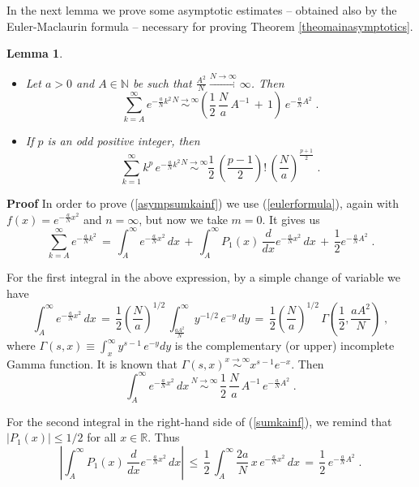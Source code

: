\documentclass[12pt]{article}
\newtheorem{lemma}{Lemma}
\begin{document}
In the next lemma we prove some asymptotic estimates -- obtained also by the Euler-Maclaurin formula -- necessary for proving Theorem \ref{theomainasymptotics}.
\begin{lemma}  \label{lemmaasympeuler}
\begin{itemize}
\item[(i)] Let $a>0$ and $A \in \mathbb{N}$ be such that $\frac{A^2}{N} \stackrel{N \rightarrow \infty}{\rightarrow} \infty$. Then
	\begin{equation}  \label{asympsumkainf}
		\sum_{k=A}^{\infty} e^{-\frac{a}{N}k^2} \stackrel{N \rightarrow \infty}{\sim}  \left(\frac{1}{2}\, \frac{N}{a} \, A^{-1} \,+\,1\right) \, e^{-\frac{a}{N}A^2}\;. 
	\end{equation}
\item[(ii)] If $p$ is an odd positive integer, then
\begin{equation}  \label{asympsumkp}
\sum_{k=1}^{\infty} k^p \, e^{-\frac{a}{N}k^2} \stackrel{N \rightarrow \infty}{\sim} \frac{1}{2} \, (\frac{p-1}{2})! \, \left(\frac{N}{a}\right)^{\frac{p+1}{2}}\;.
\end{equation}
\end{itemize}
\end{lemma}
\textbf{Proof}
In order to prove (\ref{asympsumkainf}) we use (\ref{eulerformula}), again with $f(x)=e^{-\frac{a}{N} x^2}$ and $n=\infty$, but now we take $m=0$. It gives us
\begin{equation}  \label{sumkainf}
\sum_{k=A}^{\infty} e^{-\frac{a}{N} k^2} \,=\, \int_A^{\infty} e^{-\frac{a}{N} x^2}\,dx \,+\, \int_A^{\infty} P_1(x) \, \frac{d}{dx} e^{-\frac{a}{N} x^2} \,dx \,+\, \frac{1}{2} e^{-\frac{a}{N} A^2}\;.
\end{equation}

For the first integral in the above expression, by a simple change of variable we have
\[\int_A^{\infty} e^{-\frac{a}{N} x^2}\,dx \,=\, \frac{1}{2}\left(\frac{N}{a}\right)^{1/2} \, \int_{\frac{a A^2}{N}}^{\infty} y^{-1/2} \, e^{-y} \, dy \,=\, \frac{1}{2}\left(\frac{N}{a}\right)^{1/2} \,\Gamma(\frac{1}{2}, \frac{a A^2}{N})\;, \]
where $\Gamma(s,x)\equiv \int_x^{\infty} y^{s-1} \, e^{-y}dy$ is the complementary (or upper) incomplete Gamma function. It is known that \cite{olver} $\Gamma(s,x) \stackrel{x \rightarrow \infty}{\sim} x^{s-1} e^{-x}$. Then
\[\int_A^{\infty} e^{-\frac{a}{N} x^2}\,dx \, \stackrel{N \rightarrow \infty}{\sim}\,  \frac{1}{2} \, \frac{N}{a} \, A^{-1} \, e^{-\frac{a}{N} A^2}\;.\]

For the second integral in the right-hand side of (\ref{sumkainf}), we remind that $|P_1(x)| \leq 1/2$ for all $x \in \mathbb{R}$. Thus
\[\left|\int_A^{\infty} P_1(x) \, \frac{d}{dx} e^{-\frac{a}{N} x^2} \,dx\right| \,\leq \, \frac{1}{2} \, \int_A^{\infty} \frac{2a}{N} \,x \, e^{-\frac{a}{N} x^2}\, dx \,=\, \frac{1}{2} \, e^{-\frac{a}{N}A^2}\;.\]
\end{document}
